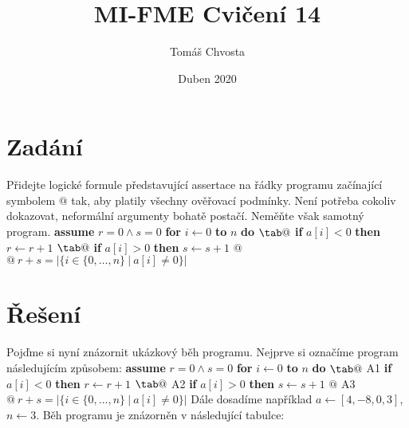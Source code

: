 \documentclass{article}
\title{MI-FME Cvičení 14}
\author{Tomáš Chvosta}
\date{Duben 2020}
\newcommand\tab[1][0.5cm]{\hspace*{#1}}
\begin{document}
\maketitle

\section{Zadání}

Přidejte logické formule představující assertace na řádky programu začínající symbolem $@$ tak, aby platily všechny ověřovací podmínky. Není potřeba cokoliv dokazovat, neformální argumenty bohatě postačí. Neměňte však samotný program. \newline\newline \textbf{assume} $r = 0 \wedge s = 0$ \newline \textbf{for} $i \leftarrow 0$ \textbf{to} $n$ \textbf{do} \newline $\tab@$ \newline \tab \textbf{if} $a[i] < 0$ \textbf{then} $r \leftarrow r + 1$ \newline $\tab@$ \newline \tab \textbf{if} $a[i] > 0$ \textbf{then} $s \leftarrow s + 1$ \newline \tab $@$ \newline $@\ r + s = |\{i \in \{0,\dots,n\}\ |\ a[i] \neq 0\}|$

\section{Řešení}

Pojďme si nyní znázornit ukázkový běh programu. Nejprve si označíme program následujícím způsobem: \newline\newline \textbf{assume} $r = 0 \wedge s = 0$ \newline \textbf{for} $i \leftarrow 0$ \textbf{to} $n$ \textbf{do} \newline $\tab@$ A1 \newline \tab \textbf{if} $a[i] < 0$ \textbf{then} $r \leftarrow r + 1$ \newline $\tab@$ A2 \newline \tab \textbf{if} $a[i] > 0$ \textbf{then} $s \leftarrow s + 1$ \newline \tab $@$ A3 \newline $@\ r + s = |\{i \in \{0,\dots,n\}\ |\ a[i] \neq 0\}|$ \newline\newline
Dále dosadíme například $a \leftarrow [4,-8,0,3]$, $n \leftarrow 3$. Běh programu je znázorněn v následující tabulce:
\end{document}

